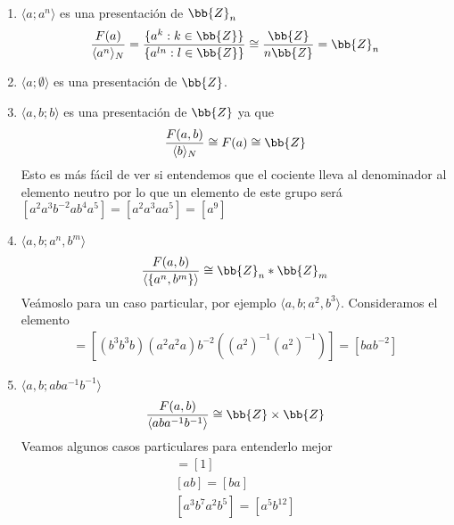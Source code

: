 \begin{ejemplo}\
    \begin{enumerate}
        \item $\langle a; a^n \rangle$ es una presentación de $\bb{Z}_n$
        \begin{gather*}
            \frac{F(a)}{\langle a^n \rangle_N} = \frac{\{a^k : k\in \bb{Z}\}}{\{a^{ln} : l\in \bb{Z}\}} \cong \frac{\bb{Z}}{n\bb{Z}} = \bb{Z}_n
        \end{gather*}

        \item $\langle a; \emptyset \rangle$ es una presentación de $\bb{Z}$.
        \item $\langle a,b ; b\rangle$ es una presentación de $\bb{Z}$ ya que
        \begin{gather*}
            \frac{F(a,b)}{\langle b \rangle_N} \cong F(a) \cong \bb{Z}
        \end{gather*}
        Esto es más fácil de ver si entendemos que el cociente lleva al denominador al elemento neutro por lo que un elemento de este grupo será $[a^2a^3b^{-2} a b^{4} a^5] = [a^2a^3a a^5] = [a^9]$

        \item $\langle a,b;a^n,b^m \rangle$
        \begin{gather*}
            \frac{F(a,b)}{\langle \{a^n, b^m\} \rangle} \cong \bb{Z}_n \ast \bb{Z}_m
        \end{gather*}
        Veámoslo para un caso particular, por ejemplo $\langle a, b; a^2,b^3\rangle$. Consideramos el elemento
        \begin{gather*}
            [b^7a^5b^{-2}a^{-4}] =[ (b^3b^3b)(a^2a^2a)b^{-2}((a^2)^{-1}(a^2)^{-1})] =[bab^{-2}]
        \end{gather*}

        \item $\langle a,b; aba^{-1}b^{-1} \rangle$
        \begin{gather*}
            \frac{F(a,b)}{\langle aba^{-1}b^{-1} \rangle} \cong \bb{Z}\times \bb{Z}
        \end{gather*}
        Veamos algunos casos particulares para entenderlo mejor
        \begin{gather*}
            [aba^{-1}b^{-1}] = [1]\\
            [ab] = [ba]\\
            [a^3b^7a^2b^5] = [a^5b^{12}]
        \end{gather*}
    \end{enumerate}
\end{ejemplo}

